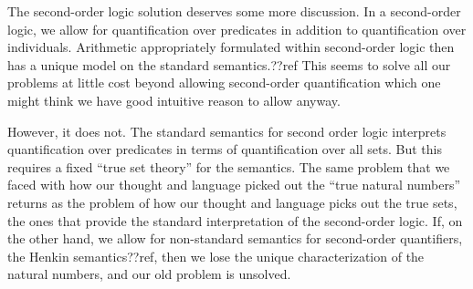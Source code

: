 The second-order logic solution deserves some more discussion. In a second-order logic, we allow
for quantification over predicates in addition to quantification over individuals. Arithmetic 
appropriately formulated within second-order logic then has a unique model on the standard 
semantics.??ref This seems to solve all our problems at little cost beyond allowing second-order
quantification which one might think we have good intuitive reason to allow anyway.

However, it does not. The standard semantics for second order logic interprets quantification 
over predicates in terms of quantification over all sets. But this requires a fixed ``true set theory''
for the semantics. The same problem that we faced with how our thought and language picked out the 
``true natural numbers'' returns as the problem of how our thought and language picks out the true sets,
the ones that provide the standard interpretation of the second-order logic. If, on the other hand, we 
allow for non-standard semantics for second-order quantifiers, the Henkin semantics??ref, then we lose 
the unique characterization of the natural numbers, and our old problem is unsolved. 

\chaptertail

